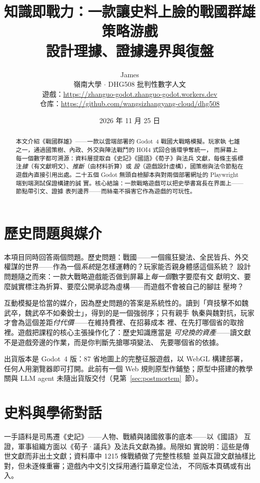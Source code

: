 \documentclass[12pt,a4paper]{article}
\title{\textbf{知識即戰力：一款讓史料上臉的戰國群雄策略游戲}\\[0.3em]
\large 設計理據、證據邊界與復盤}
\author{James\\嶺南大學 $\cdot$ DHG508 批判性數字人文\\
\footnotesize 遊戲：\url{https://zhanguo-godot.zhanguo-godot.workers.dev}\\
\footnotesize 仓库：\url{https://github.com/wangsizhangyang-cloud/dhg508}}
\date{2026 年 11 月 25 日}
\begin{document}
\maketitle

\begin{abstract}
\noindent
本文介紹《戰國群雄》——一款以雲端部署的 Godot~4 戰國大戰略模擬。玩家執
七雄之一，通過國策樹、內政、外交與陣法戰鬥的 HOI4 式回合循環爭奪統一，
而屏幕上每一個數字都可溯源：資料層提取自《史記》《國語》《荀子》與法兵
文獻，每條主張標注\emph{據}（有文獻明文）、\emph{推斷}（由材料折算）或
\emph{設}（遊戲設計虛構），國策樹與法令節點在遊戲內直接引用出處。二十五個
Godot 無頭自檢腳本與對兩個部署網址的 Playwright 端到端測試保證構建的誠
實。核心結論：一款戰略遊戲可以把史學書寫長在界面上——節點帶引文、證據
表列邊界——而絲毫不損害它作為遊戲的可玩性。
\end{abstract}

\onehalfspacing

\section{歷史問題與媒介}

本項目同時回答兩個問題。歷史問題：戰國——一個瘋狂變法、全民皆兵、外交
權謀的世界——作為一個\emph{系統}是怎樣運轉的？玩家能否親身體感這個系統？
設計問題隨之而來：一款大戰略遊戲能否做到屏幕上\emph{每一個}數字要麼有文
獻明文、要麼誠實標注為折算、要麼公開承認為虛構——而遊戲不會被自己的腳註
壓垮？

互動模擬是恰當的媒介，因為歷史問題的答案是系統性的。讀到「齊技擊不如魏
武卒，魏武卒不如秦銳士」\autocite{xunzi}，得到的是一個強弱序；只有親手
執秦與魏對抗，玩家才會為這個差距\emph{付代價}——在維持費裡、在招募成本
裡、在先打哪個省的取捨裡。遊戲把課程的核心主張操作化了：歷史知識應當是
\emph{可兌換的資產}——讀文獻不是遊戲旁邊的作業，而是你判斷先搶哪項變法、
先要哪個省的依據。

出貨版本是 Godot~4 版：87 省地圖上的完整征服遊戲，以 WebGL 構建部署，
任何人用瀏覽器即可打開。此前有一個 Web 規則原型作鋪墊；原型中搭建的教學
關與 LLM agent 未隨出貨版交付（見第~\ref{sec:postmortem}~節）。

\section{史料與學術對話}

一手語料是司馬遷《史記》——人物、戰績與諸國敘事的底本——以《國語》
\autocite{guoyu}互證，軍事組織方面以《荀子·議兵》及法兵文獻為據。局限如
實說明：這些是傳世文獻而非出土文獻；資料庫中 1215 條戰績做了完整性核驗
並與互證文獻抽樣比對，但未逐條重審；遊戲內中文引文採用通行篇章定位法，
不同版本頁碼或有出入。
\end{document}
